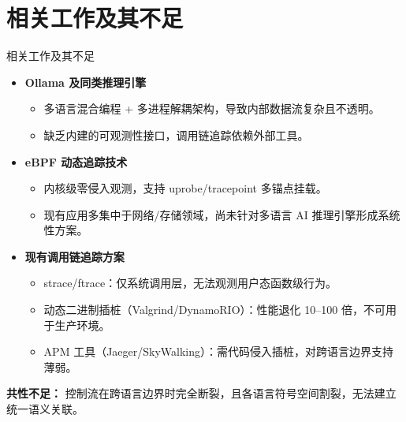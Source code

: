 \documentclass[aspectratio=169, 10pt]{beamer}
\begin{document}
\section{相关工作及其不足}
\begin{frame}{相关工作及其不足}
    \begin{itemize}
        \item \textbf{Ollama 及同类推理引擎}
            \begin{itemize}
                \item 多语言混合编程 + 多进程解耦架构，导致内部数据流复杂且不透明。
                \item 缺乏内建的可观测性接口，调用链追踪依赖外部工具。
            \end{itemize}

        \item \textbf{eBPF 动态追踪技术}
            \begin{itemize}
                \item 内核级零侵入观测，支持 uprobe/tracepoint 多锚点挂载。
                \item 现有应用多集中于网络/存储领域，尚未针对多语言 AI 推理引擎形成系统性方案。
            \end{itemize}

        \item \textbf{现有调用链追踪方案}
            \begin{itemize}
                \item strace/ftrace：仅系统调用层，无法观测用户态函数级行为。
                \item 动态二进制插桩（Valgrind/DynamoRIO）：性能退化 10--100 倍，不可用于生产环境。
                \item APM 工具（Jaeger/SkyWalking）：需代码侵入插桩，对跨语言边界支持薄弱。
            \end{itemize}
    \end{itemize}

    \vspace{0.5em}
    \textbf{共性不足：} 控制流在跨语言边界时完全断裂，且各语言符号空间割裂，无法建立统一语义关联。
\end{frame}

\end{document}
